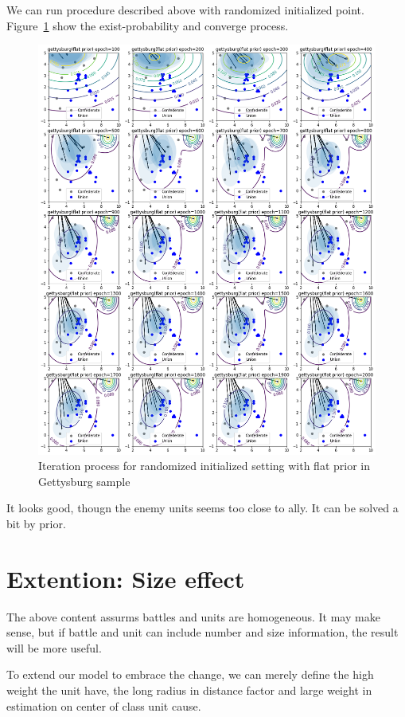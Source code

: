 \documentclass{article}
\begin{document}
We can run procedure described above with randomized initialized point. 
Figure~\ref{fig:gettysburgInit} show the exist-probability and converge process.

\begin{figure}[h]
\includegraphics[width=0.99\linewidth]{gettysburg-init.png}
\caption{Iteration process for randomized initialized setting with flat prior in Gettysburg sample}
\label{fig:gettysburgInit}
\end{figure}

It looks good, thougn the enemy units seems too close to ally. It can be solved a bit by prior.


\section{Extention: Size effect}

The above content assurms battles and units are homogeneous. It may make sense,
but if battle and unit can include number and size information, the result will be more useful.

To extend our model to embrace the change, we can merely define the high weight the unit have,
the long radius in distance factor and large weight in estimation on center of class unit cause.
\end{document}
